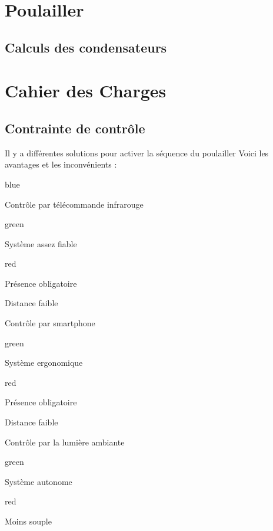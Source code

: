 \chapter{Poulailler}

\section{Calculs des condensateurs}

\chapter{Cahier des Charges}

\section{Contrainte de contrôle}

Il y a différentes solutions pour activer la séquence du poulailler 
Voici les avantages et les inconvénients :

\begin{items}{blue}{\Triangle}
    \item Contrôle par télécommande infrarouge
    \begin{items}{green}{\Bullet}
        \item Système assez fiable
    \end{items}
    \begin{items}{red}{\Bullet}
        \item Présence obligatoire
        \item Distance faible
    \end{items}
    \item Contrôle par smartphone
    \begin{items}{green}{\Bullet}
        \item Système ergonomique
    \end{items}
    \begin{items}{red}{\Bullet}
        \item Présence obligatoire
        \item Distance faible
    \end{items}
    \item Contrôle par la lumière ambiante
    \begin{items}{green}{\Bullet}
        \item Système autonome
    \end{items}
    \begin{items}{red}{\Bullet}
        \item Moins souple
    \end{items}
\end{items}


